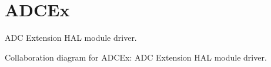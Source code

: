 \hypertarget{group__ADCEx}{}\section{A\+D\+C\+Ex}
\label{group__ADCEx}


A\+DC Extension H\+AL module driver.  


Collaboration diagram for A\+D\+C\+Ex\+:
A\+DC Extension H\+AL module driver. 

